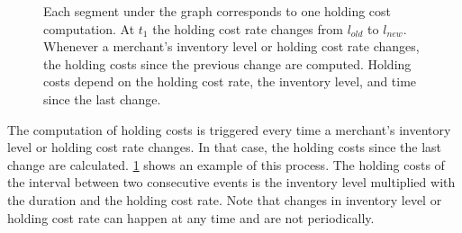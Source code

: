 \begin{figure}[t]
\centering
{}
\caption[Visualized Calculation of Holding Costs]{
Each segment under the graph corresponds to one holding cost computation.
At $t_1$ the holding cost rate changes from $l_{old}$ to $l_{new}$.
Whenever a merchant's inventory level or holding cost rate changes, the holding costs since the previous change are computed.
Holding costs depend on the holding cost rate, the inventory level, and time since the last change.}
\label{fig:holding_cost}
\end{figure}

The computation of holding costs is triggered every time a merchant's inventory level or holding cost rate changes.
In that case, the holding costs since the last change are calculated.
\cref{fig:holding_cost} shows an example of this process.
The holding costs of the interval between two consecutive events is the inventory level multiplied with the duration and the holding cost rate.
Note that changes in inventory level or holding cost rate can happen at any time and are not periodically.

